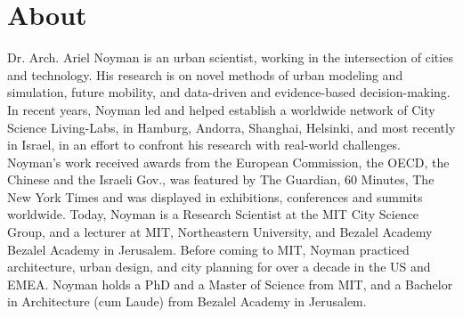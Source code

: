 \section*{About}

 {
Dr. Arch. Ariel Noyman is an urban scientist, working in the intersection of cities and technology. His research is on novel methods of urban modeling and simulation, future mobility, and data-driven and evidence-based decision-making. In recent years, Noyman led and helped establish a worldwide network of City Science Living-Labs, in Hamburg, Andorra, Shanghai, Helsinki, and most recently in Israel, in an effort to confront his research with real-world challenges. 
Noyman's work received awards from the European Commission, the OECD, the Chinese and the Israeli Gov., was featured by The Guardian, 60 Minutes, The New York Times and was displayed in exhibitions, conferences and summits worldwide. Today, Noyman is a Research Scientist at the MIT City Science Group, and a lecturer at MIT, Northeastern University, and Bezalel Academy Bezalel Academy in Jerusalem. Before coming to MIT, Noyman practiced architecture, urban design, and city planning for over a decade in the US and EMEA. Noyman holds a PhD and a Master of Science from MIT, and a Bachelor in Architecture (cum Laude) from Bezalel Academy in Jerusalem.
 }

